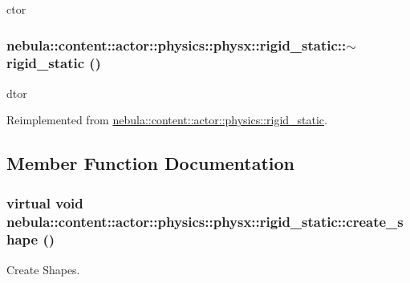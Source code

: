 ctor \hypertarget{classnebula_1_1content_1_1actor_1_1physics_1_1physx_1_1rigid__static_ae09741dd8e7c2eff61b897983ddedf70}{
\subsubsection[{$\sim$rigid\_\-static}]{\setlength{\rightskip}{0pt plus 5cm}nebula::content::actor::physics::physx::rigid\_\-static::$\sim$rigid\_\-static ()}}
\label{classnebula_1_1content_1_1actor_1_1physics_1_1physx_1_1rigid__static_ae09741dd8e7c2eff61b897983ddedf70}


dtor 

Reimplemented from \hyperlink{classnebula_1_1content_1_1actor_1_1physics_1_1rigid__static_a7dffb6ad1b4b49383a7c7c2fa28be0cf}{nebula::content::actor::physics::rigid\_\-static}.

\subsection{Member Function Documentation}
\hypertarget{classnebula_1_1content_1_1actor_1_1physics_1_1physx_1_1rigid__static_aa98f8ef1b2ba6b59b36e4e6506aee2d9}{
\subsubsection[{create\_\-shape}]{\setlength{\rightskip}{0pt plus 5cm}virtual void nebula::content::actor::physics::physx::rigid\_\-static::create\_\-shape ()}}
\label{classnebula_1_1content_1_1actor_1_1physics_1_1physx_1_1rigid__static_aa98f8ef1b2ba6b59b36e4e6506aee2d9}


Create Shapes. 

